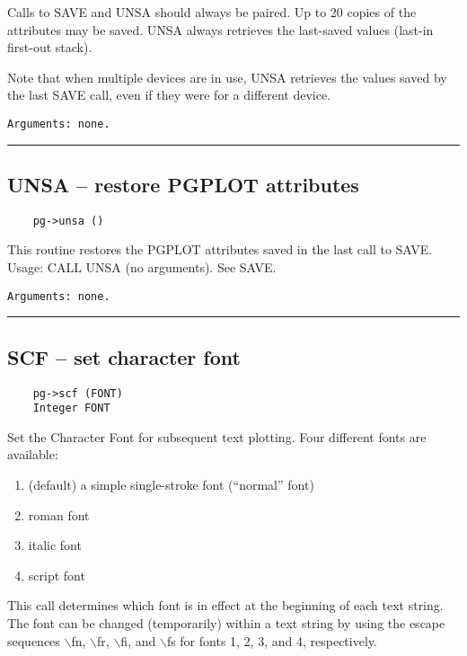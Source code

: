 Calls to SAVE and UNSA should always be paired.  Up to 20 copies of
the attributes may be saved.  UNSA always retrieves the last-saved
values (last-in first-out stack).

Note that when multiple devices are in use, UNSA retrieves the values
saved by the last SAVE call, even if they were for a different device.

\begin{verbatim}
Arguments: none.
\end{verbatim}

\hrule

\subsection*{UNSA -- restore PGPLOT attributes }

\begin{verbatim}
    pg->unsa ()
\end{verbatim}

This routine restores the PGPLOT attributes saved in the last call to
SAVE.  Usage: CALL UNSA (no arguments).  See SAVE.

\begin{verbatim}
Arguments: none.
\end{verbatim}

\hrule

\subsection*{SCF -- set character font }

\begin{verbatim}
    pg->scf (FONT)
    Integer FONT
\end{verbatim}

Set the Character Font for subsequent text plotting.  Four different
fonts are available:

\begin{enumerate}
\item (default) a simple single-stroke font (``normal'' font)
\item roman font
\item italic font
\item script font
\end{enumerate}

This call determines which font is in effect at the beginning of each
text string.  The font can be changed (temporarily) within a text
string by using the escape sequences $\backslash$fn, $\backslash$fr,
$\backslash$fi, and $\backslash$fs for fonts 1, 2, 3, and 4,
respectively.

